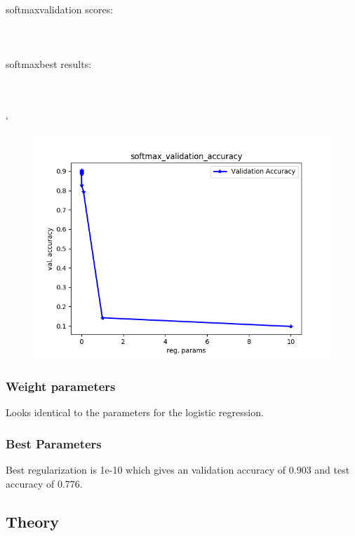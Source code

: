 \documentclass[paper=a4, fontsize=11pt]{scrartcl} %
\numberwithin{equation}{section} %
\numberwithin{figure}{section} %
\numberwithin{table}{section} %
\begin{document}
softmax\textunderscore validation \textunderscore scores: \\
 \\ \\ \\

softmax\textunderscore best \textunderscore results: \\
 \\ \\ \\

`\begin{figure}[h]
\center
\includegraphics[]{softmax_validation_accuracy.png}
\end{figure}


\subsubsection{Weight parameters}
Looks identical to the parameters for the logistic regression.

\subsubsection{Best Parameters}
Best regularization is 1e-10 which gives an validation accuracy of 0.903 and test accuracy of 0.776.

\subsection{Theory}
\end{document}
